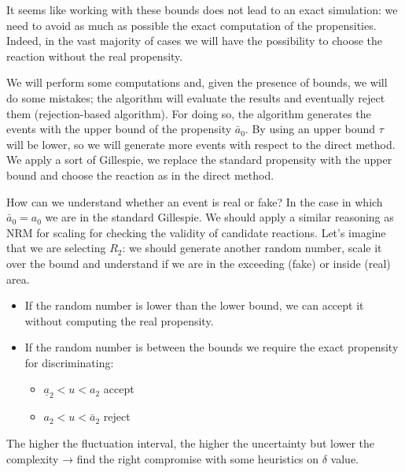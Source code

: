 It seems like working with these bounds does not lead to an exact
simulation: we need to avoid as much as possible the exact computation
of the propensities. Indeed, in the vast majority of cases we will have
the possibility to choose the reaction without the real propensity.

We will perform some computations and, given the presence of bounds, we
will do some mistakes; the algorithm will evaluate the results and
eventually reject them (rejection-based algorithm). For doing so, the
algorithm generates the events with the upper bound of the propensity
$\bar{a}_0$. By using an upper bound $\tau$ will be lower, so we will
generate more events with respect to the direct method. We apply a sort
of Gillespie, we replace the standard propensity with the upper bound
and choose the reaction as in the direct method.

How can we understand whether an event is real or fake? In the case in
which $\bar{a}_0 = a_0$ we are in the standard Gillespie. We should
apply a similar reasoning as NRM for scaling for checking the validity
of candidate reactions. Let's imagine that we are selecting $R_2$: we
should generate another random number, scale it over the bound and
understand if we are in the exceeding (fake) or inside (real) area.

\begin{itemize}
\tightlist
\item
  If the random number is lower than the lower bound, we can accept it
  without computing the real propensity.
\item
  If the random number is between the bounds we require the exact
  propensity for discriminating:

  \begin{itemize}
  \tightlist
  \item
    $\underline{a}_2 < u < a_2$ accept
  \item
    $a_2 < u < \bar{a}_2$ reject
  \end{itemize}
\end{itemize}

The higher the fluctuation interval, the higher the uncertainty but
lower the complexity → find the right compromise with some heuristics on
$\delta$ value.
